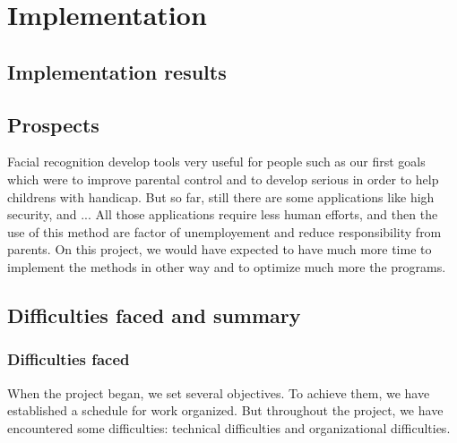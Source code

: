 \chapter{Implementation}



\section{Implementation results}
\section{Prospects}
Facial recognition develop tools very useful for people such as our first goals which were to improve parental control and to develop serious in order to help childrens with handicap. But so far, still there are some applications like high security, and ... All those applications require less human efforts, and then the use of this method are factor of unemployement and reduce responsibility from parents.
On this project, we would have expected to have much more time to implement the methods in other way and to optimize much more the programs.


\section{Difficulties faced and summary}
\subsection{Difficulties faced}

When the project began, we set several objectives. To achieve them, we have established a  schedule for work organized. But throughout the project, we have encountered some difficulties: technical difficulties and organizational difficulties.
